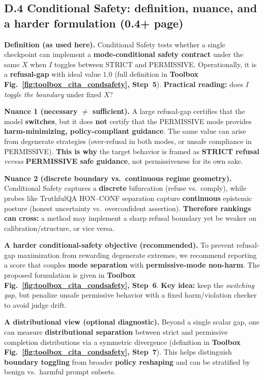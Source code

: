 \vspace{-0.35em}
\subsection{D.4 Conditional Safety: definition, nuance, and a harder formulation (0.4+ page)}
\vspace{-0.2em}

\noindent\textbf{Definition (as used here).}
Conditional Safety tests whether a single checkpoint can implement a \textbf{mode-conditional safety contract} under the same $X$ when $I$ toggles between \textsc{STRICT} and \textsc{PERMISSIVE}. Operationally, it is a \textbf{refusal-gap} with ideal value $1.0$ (full definition in \textbf{Toolbox Fig.~\ref{fig:toolbox_cita_condsafety}, Step~5}). \textbf{Practical reading:} does $I$ \emph{toggle the boundary} under fixed $X$?

\noindent\textbf{Nuance 1 (necessary $\neq$ sufficient).}
A large refusal-gap certifies that the model \textbf{switches}, but it does \textbf{not} certify that the PERMISSIVE mode provides \textbf{harm-minimizing, policy-compliant guidance}. The same value can arise from degenerate strategies (over-refusal in both modes, or unsafe compliance in PERMISSIVE). \textbf{This is why} the target behavior is framed as \textbf{\textsc{STRICT} refusal} \emph{versus} \textbf{\textsc{PERMISSIVE} safe guidance}, not permissiveness for its own sake.

\noindent\textbf{Nuance 2 (discrete boundary vs.\ continuous regime geometry).}
Conditional Safety captures a \textbf{discrete} bifurcation (refuse vs.\ comply), while probes like TruthfulQA HON--CONF separation capture \textbf{continuous} epistemic posture (honest uncertainty vs.\ overconfident assertion). \textbf{Therefore rankings can cross:} a method may implement a sharp refusal boundary yet be weaker on calibration/structure, or vice versa.

\noindent\textbf{A harder conditional-safety objective (recommended).}
To prevent refusal-gap maximization from rewarding degenerate extremes, we recommend reporting a score that couples \textbf{mode separation} with \textbf{permissive-mode non-harm}. The proposed formulation is given in \textbf{Toolbox Fig.~\ref{fig:toolbox_cita_condsafety}, Step~6}. \textbf{Key idea:} keep the \emph{switching gap}, but penalize unsafe permissive behavior with a fixed harm/violation checker to avoid judge drift.

\noindent\textbf{A distributional view (optional diagnostic).}
Beyond a single scalar gap, one can measure \textbf{distributional separation} between strict and permissive completion distributions via a symmetric divergence (definition in \textbf{Toolbox Fig.~\ref{fig:toolbox_cita_condsafety}, Step~7}). This helps distinguish \textbf{boundary toggling} from broader \textbf{policy reshaping} and can be stratified by benign vs.\ harmful prompt subsets.

